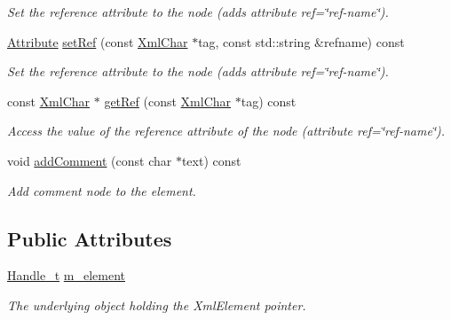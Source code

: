\begin{DoxyCompactItemize}
\begin{DoxyCompactList}\small\item\em Set the reference attribute to the node (adds attribute ref=\char`\"{}ref-\/name\char`\"{}). \item\end{DoxyCompactList}\item 
\hyperlink{namespace_d_d4hep_1_1_x_m_l_a5c19b7116be99d69b4b22d911357baaf}{Attribute} \hyperlink{class_d_d4hep_1_1_x_m_l_1_1_element_a6e09d39f370e992ccff1d6a5a9aea9d5}{setRef} (const \hyperlink{namespace_d_d4hep_1_1_x_m_l_a09e5d9cc86ed782f6826dfe0778c1815}{XmlChar} $\ast$tag, const std::string \&refname) const 
\begin{DoxyCompactList}\small\item\em Set the reference attribute to the node (adds attribute ref=\char`\"{}ref-\/name\char`\"{}). \item\end{DoxyCompactList}\item 
const \hyperlink{namespace_d_d4hep_1_1_x_m_l_a09e5d9cc86ed782f6826dfe0778c1815}{XmlChar} $\ast$ \hyperlink{class_d_d4hep_1_1_x_m_l_1_1_element_a5a8a5fe4e0cfef155c88a8c444e3ef0b}{getRef} (const \hyperlink{namespace_d_d4hep_1_1_x_m_l_a09e5d9cc86ed782f6826dfe0778c1815}{XmlChar} $\ast$tag) const 
\begin{DoxyCompactList}\small\item\em Access the value of the reference attribute of the node (attribute ref=\char`\"{}ref-\/name\char`\"{}). \item\end{DoxyCompactList}\item 
void \hyperlink{class_d_d4hep_1_1_x_m_l_1_1_element_a6503c7da3a4cb6f04943175f85f1ac6f}{addComment} (const char $\ast$text) const 
\begin{DoxyCompactList}\small\item\em Add comment node to the element. \item\end{DoxyCompactList}\end{DoxyCompactItemize}
\subsection*{Public Attributes}
\begin{DoxyCompactItemize}
\item 
\hyperlink{class_d_d4hep_1_1_x_m_l_1_1_handle__t}{Handle\_\-t} \hyperlink{class_d_d4hep_1_1_x_m_l_1_1_element_aa79a832ef142a29be556a3ec21c4e36d}{m\_\-element}
\begin{DoxyCompactList}\small\item\em The underlying object holding the XmlElement pointer. \item\end{DoxyCompactList}\end{DoxyCompactItemize}


